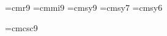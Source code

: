 
\font\ninerm=cmr9
\font\ninei=cmmi9
\font\ninesy=cmsy9
\font\sixsy=cmsy7
\font\fivesy=cmsy6

\font\ninecsc=cmcsc9

\def\ninept{
        \textfont0=\ninerm
        \textfont1=\ninei
        \textfont2=\ninesy
        \scriptfont2=\sixsy
        \scriptscriptfont2=\fivesy
}


\def\true#1{
    #1\ {\rm true}
}

\def\pftree#1#2#3{
    \vbox{\tabskip=0pt\offinterlineskip
        \halign{
            ##& \hskip0pt ## \cr
            \hfil#1\hfil & \cr
            \leaders\hrule height2.85pt depth-2.55pt \hfill & \hbox{\ninept #3} \cr
            \hfil#2\hfil & \cr
        }
    }
}

\def\underhyp#1#2{
    \vbox{\tabskip=0pt\offinterlineskip
        \halign{
            ## & \hskip-4pt ## \cr
            \leaders\hrule height2.85pt depth-2.55pt \hfill & \hbox{\ninept #1} \cr
            \hfil#2\hfil & \cr
        }
    }
}

\def\floatover#1#2{
    \vbox{\tabskip=0pt \offinterlineskip
        \halign{
            ##\cr
            \hfil#1\hfil \cr
            \noalign{\vskip 5pt}
            \hfil#2\hfil \cr
        }
    }
}

\def\somehow#1#2{
    \vbox{\tabskip=0pt \offinterlineskip
        \halign{
            ##\cr
            \hfil#1\hfil \cr
            \noalign{\vskip -2pt}
            \hfil$\vdots$\hfil \cr
            \noalign{\vskip 5pt}
            \hfil#2\hfil \cr
        }
    }
}
